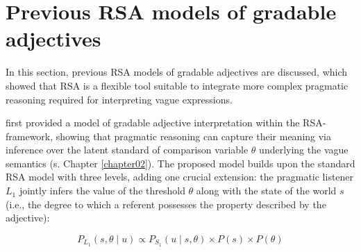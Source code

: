 
\section{Previous RSA models of gradable adjectives}
In this section, previous RSA models of gradable adjectives are discussed, which showed that RSA is a flexible tool suitable to integrate more complex pragmatic reasoning required for interpreting vague expressions.

\textcite{lassiter2013context} first provided a model of gradable adjective interpretation within the RSA-framework, showing that pragmatic reasoning can capture their meaning via inference over the latent standard of comparison variable $\theta$ underlying the vague semantics (s. Chapter \ref{chapter02}). %
The proposed model builds upon the standard RSA model with three levels, adding one crucial extension: the pragmatic listener $L_1$ jointly infers the value of the threshold $\theta$ along with the state of the world $s$ (i.e., the degree to which a referent possesses the property described by the adjective):

$$P_{L_1} (s, \theta \mid u) \propto P_{S_1} (u \mid s, \theta) \times P (s) \times P(\theta)$$ 

